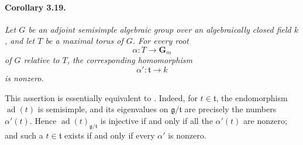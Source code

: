 \paragraph{\textbf{Corollary 3.19.}}
{\itshape Let \(G\) be an adjoint semisimple algebraic group over
an algebraically closed field \(k\), and let \(T\) be a maximal
torus of \(G\). For every root
\[
  \alpha\colon T\longrightarrow\mathbf G_m
\]
of \(G\) relative to \(T\), the corresponding homomorphism
\[
  \alpha'\colon\mathfrak t\longrightarrow k
\]
is nonzero.}

This assertion is essentially equivalent to . Indeed,
for \(t\in\mathfrak t\), the endomorphism
\(\operatorname{ad}(t)\) is semisimple, and its eigenvalues on
\(\mathfrak g/\mathfrak t\) are precisely the numbers
\(\alpha'(t)\). Hence
\(\operatorname{ad}(t)_{\mathfrak g/\mathfrak t}\) is injective if
and only if all the \(\alpha'(t)\) are nonzero; and such a
\(t\in\mathfrak t\) exists if and only if every \(\alpha'\) is
nonzero.
